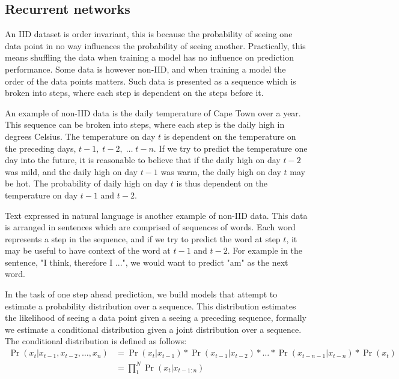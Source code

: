 
\subsection{Recurrent networks}

An IID dataset is order invariant, this is because the probability of seeing one data point in no way influences the probability of seeing another. Practically, this means shuffling the data when training a model has no influence on prediction performance. Some data is however non-IID, and when training a model the order of the data points matters. Such data is presented as a sequence which is broken into steps, where each step is dependent on the steps before it. \par

\noindent An example of non-IID data is the daily temperature of Cape Town over a year. This sequence can be broken into steps, where each step is the daily high in degrees Celsius. The temperature on day $ t $ is dependent on the temperature on the preceding days, $ t - 1, \; t - 2, \; \dots \; t - n $. If we try to predict the temperature one day into the future, it is reasonable to believe that if the daily high on day $ t - 2 $ was mild, and the daily high on day $ t - 1 $ was warm, the daily high on day $ t $ may be hot. The probability of daily high on day $ t $ is thus dependent on the temperature on day $ t - 1$ and $ t - 2$. \par
 
\noindent Text expressed in natural language is another example of non-IID data. This data is arranged in sentences which are comprised of sequences of words. Each word represents a step in the sequence, and if we try to predict the word at step $ t $, it may be useful to have context of the word at $t -1$ and $t - 2$. For example in the sentence, "I think, therefore I ...", we would want to predict "am" as the next word. \par

\noindent In the task of one step ahead prediction, we build models that attempt to estimate a probability distribution over a sequence. This distribution estimates the likelihood of seeing a data point given a seeing a preceding sequence, formally we estimate a conditional distribution given a joint distribution over a sequence. The conditional distribution is defined as follows:
\begin{equation}
	\begin{split}
		\Pr( x_t | x_{t - 1},  x_{t - 2}, \dots,  x_n ) & = \Pr(x_t | x_{t - 1}) * \Pr(x_{t - 1}| x_{t - 2}) * \dots * \Pr(x_{t - n - 1}| x_{t - n}) * \Pr(x_t) \\
		& =\prod_{1}^N \Pr(x_t | x_{t - 1:n})
	\end{split}
\end{equation}


